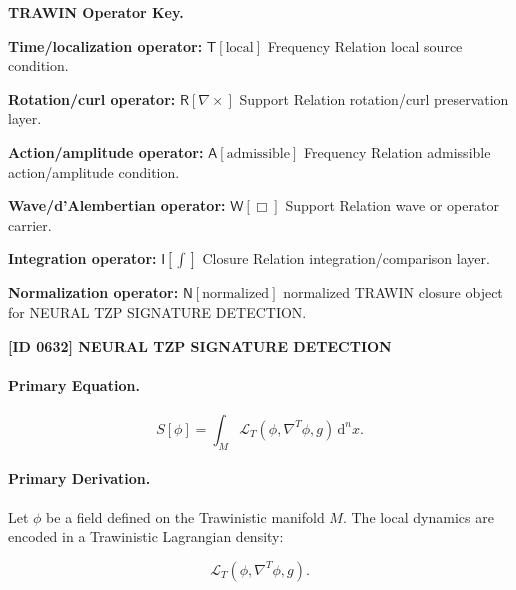 \par\vspace{0.45\baselineskip}
\noindent\begin{minipage}[t]{\linewidth}
\begingroup
\small
\raggedright
\textbf{TRAWIN Operator Key.}\par
\noindent\textbf{Time/localization operator:} $\mathsf{T}\!\left[\mathrm{local}\right]$ Frequency Relation local source condition.\par
\noindent\textbf{Rotation/curl operator:} $\mathsf{R}\!\left[\nabla\times\right]$ Support Relation rotation/curl preservation layer.\par
\noindent\textbf{Action/amplitude operator:} $\mathsf{A}\!\left[\mathrm{admissible}\right]$ Frequency Relation admissible action/amplitude condition.\par
\noindent\textbf{Wave/d'Alembertian operator:} $\mathsf{W}\!\left[\Box\right]$ Support Relation wave or operator carrier.\par
\noindent\textbf{Integration operator:} $\mathsf{I}\!\left[\int\right]$ Closure Relation integration/comparison layer.\par
\noindent\textbf{Normalization operator:} $\mathsf{N}\!\left[\mathrm{normalized}\right]$ normalized TRAWIN closure object for NEURAL TZP SIGNATURE DETECTION.\par
\endgroup
\end{minipage}

\clearpage
\noindent\textbf{[ID 0632] NEURAL TZP SIGNATURE DETECTION}\par
\vspace{0.35em}
\paragraph{Primary Equation.}
\begin{equation}
S[\phi]
=
\int_M
\mathcal{L}_T
\left(
\phi,\nabla^T\phi,g
\right)
\,\mathrm{d}^n x .
\end{equation}

\paragraph{Primary Derivation.}
Let $\phi$ be a field defined on the Trawinistic manifold $M$.  
The local dynamics are encoded in a Trawinistic Lagrangian density:

\begin{equation}
\mathcal{L}_T
\left(
\phi,\nabla^T\phi,g
\right).
\end{equation}

